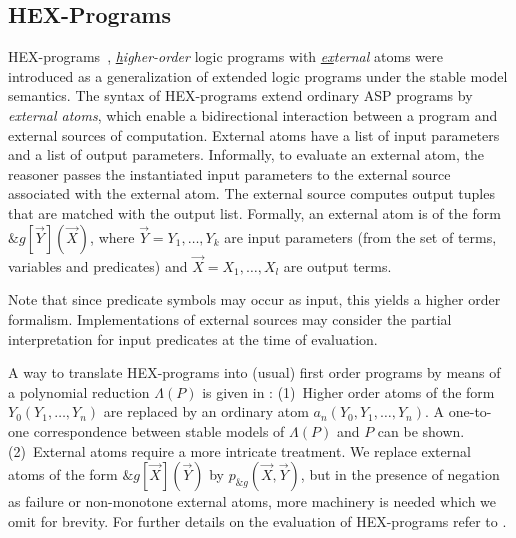 \subsection{HEX-Programs}
HEX-programs~\cite{hex}, \emph{\underline{h}igher-order} logic programs with \emph{\underline{ex}ternal} atoms were introduced as a generalization of extended logic programs under the stable model semantics. The syntax of HEX-programs extend ordinary ASP programs by \emph{external atoms}, which enable a bidirectional interaction between a program and external sources of computation. External atoms have a list of input parameters and a list of output parameters. Informally, to evaluate an external atom, the reasoner passes the instantiated input parameters to the external source associated with the external atom. The external source computes output tuples that are matched with the output list. Formally, an external atom is of the form \(\&g[\vec{Y}](\vec{X})\), where \(\vec{Y} = Y_1, \dotso , Y_k\) are input parameters (from the set of terms, variables and predicates) and \(\vec{X} = X_1, \dotso , X_l \) are output terms.

Note that since predicate symbols may occur as input, this yields a higher order formalism. Implementations of external sources may consider the partial interpretation for input predicates at the time of evaluation.

A way to translate HEX-programs into (usual) first order programs by means of a polynomial reduction \(\Lambda(P)\) is given in \cite{hex}: (1)~Higher order atoms of the form \(Y_0(Y_1, \dotso, Y_n)\) are replaced by an ordinary atom \(a_n(Y_0, Y_1, \dotso, Y_n)\). A one-to-one correspondence between stable models of \(\Lambda(P)\) and \(P\) can be shown. (2)~External atoms require a more intricate treatment. We replace external atoms of the form \(\&g[\vec{X}](\vec{Y})\) by \(p_{\&g}(\vec{X},\vec{Y})\), but in the presence of negation as failure or non-monotone external atoms, more machinery is needed which we omit for brevity. For further details on the evaluation of HEX-programs refer to \cite{effeval1,effeval2}.